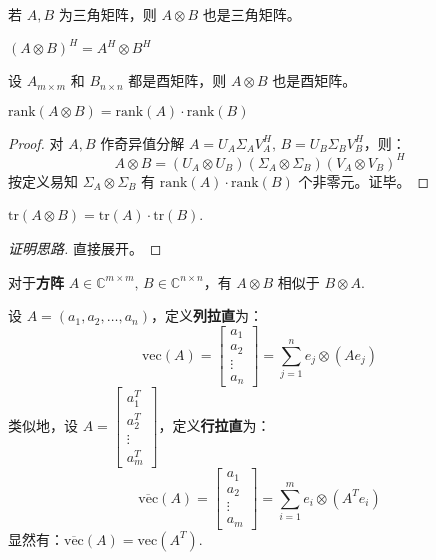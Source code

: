 \begin{property}
若 $A,B$ 为三角矩阵，则 $A\otimes B$ 也是三角矩阵。
\end{property}

\begin{property}
$(A\otimes B)^H=A^H\otimes B^H$
\end{property}

\begin{property}
设 $A_{m\times m}$ 和 $B_{n\times n}$ 都是酉矩阵，则 $A\otimes B$ 也是酉矩阵。
\end{property}

\begin{property}
$\text{rank}(A\otimes B)=\text{rank}(A)\cdot\text{rank}(B)$
\end{property}
\begin{proof}    
对 $A,B$ 作奇异值分解 $A=U_A\Sigma_AV_A^H,\,B=U_B\Sigma_BV_B^H$，则：
\[
    A\otimes B=(U_A\otimes U_B)(\Sigma_A\otimes\Sigma_B)(V_A\otimes V_B)^H
\]
按定义易知 $\Sigma_A\otimes \Sigma_B$ 有 $\text{rank}(A)\cdot\text{rank}(B)$ 个非零元。证毕。
\end{proof}

\begin{property}
$\text{tr}(A\otimes B)=\text{tr}(A)\cdot\text{tr}(B)$.
\end{property}
\begin{proof}[证明思路]
直接展开。
\end{proof}

\begin{property}
对于\textbf{方阵} $A\in\mathbb C^{m\times m},\,B\in\mathbb C^{n\times n}$，有 $A\otimes B$ 相似于 $B\otimes A$.
\end{property}

\begin{definition}[拉直算子]
设 $A=(a_1,a_2,\ldots,a_n)$，定义\textbf{列拉直}为：
\[
    \text{vec}(A)=\begin{bmatrix}a_1\\a_2\\\vdots\\a_n\end{bmatrix}=\sum_{j=1}^ne_j\otimes (Ae_j)
\]
类似地，设 $A=\begin{bmatrix}a_1^T\\a_2^T\\\vdots\\a_m^T\end{bmatrix}$，定义\textbf{行拉直}为：
\[
    \overline{\text{vec}}(A)=\begin{bmatrix}a_1\\a_2\\\vdots\\a_m\end{bmatrix}=\sum_{i=1}^me_i\otimes(A^Te_i)
\]
显然有：$\overline{\text{vec}}(A)=\text{vec}(A^T)$.
\end{definition}

